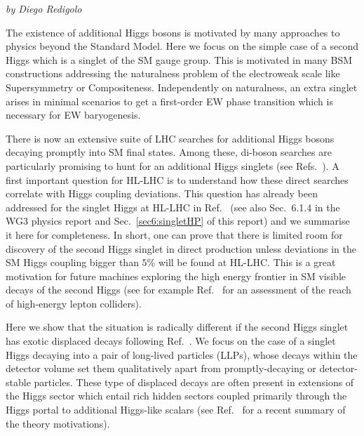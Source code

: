 \begin{center}
{\it by Diego Redigolo}
\end{center}

The existence of additional Higgs bosons is motivated by many
approaches to physics beyond the Standard Model. Here we focus on the simple case of a second Higgs which is a singlet of the SM gauge group. This is motivated in many BSM constructions addressing the naturalness problem of the electroweak scale like Supersymmetry or Compositeness. Independently on naturalness, an extra singlet arises in minimal scenarios to get a first-order EW phase transition which is necessary for EW baryogenesis. 

There is now an extensive suite of LHC searches for additional Higgs bosons decaying promptly into SM
final states. Among these, di-boson searches are particularly promising to hunt for an additional Higgs singlets (see Refs.~\cite{Sirunyan:2018qlb,Aaboud:2018knk,Sirunyan:2017isc,ATLAS:2017spa}). A first important question for HL-LHC is to understand how these direct searches correlate with Higgs coupling deviations. This question has already been addressed for the singlet Higgs at HL-LHC in Ref.~\cite{Buttazzo:2015bka} (see also Sec.~6.1.4 in the WG3 physics report \cite{CidVidal:2018eel} and Sec.~\ref{sec6:singletHP} of this report) and we summarise it here for completeness. In short, one can prove that there is limited room for discovery of the second Higgs singlet in direct production unless deviations in the SM Higgs coupling bigger than $5\%$ will be found at HL-LHC. This is a great motivation for future machines exploring the high energy frontier in SM visible decays of the second Higgs (see for example Ref.~\cite{Buttazzo:2018qqp} for an assessment of the reach of high-energy lepton colliders). 

Here we show that the situation is radically different if the second Higgs singlet has exotic displaced decays following Ref.~\cite{Alipour-fard:2018mre}. We focus on the case of a singlet Higgs decaying into a pair of long-lived particles (LLPs), whose decays within the detector volume set them qualitatively apart from promptly-decaying or detector-stable
particles. These type of displaced decays are often present in extensions of the Higgs sector which entail rich hidden sectors coupled primarily through the Higgs portal to additional Higgs-like scalars (see Ref.~\cite{Curtin:2018mvb} for a recent summary of the theory motivations).  


